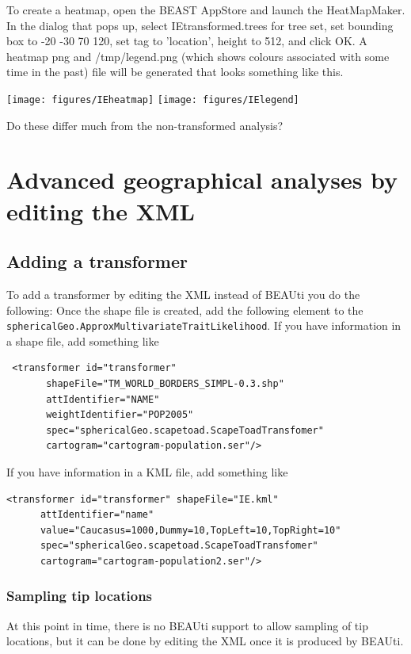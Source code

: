 \documentclass{article}
\begin{document}
To create a heatmap, open the BEAST AppStore and launch the HeatMapMaker. In the dialog that pops up, select IEtransformed.trees for tree set, set bounding box to -20 -30 70 120, set tag to 'location', height to 512,  and click OK. A heatmap png and /tmp/legend.png (which shows colours associated with some time in the past) file will be generated that looks something like this.

\texttt{[image: figures/IEheatmap]}
\texttt{[image: figures/IElegend]}

Do these differ much from the non-transformed analysis?

\section*{Advanced geographical analyses by editing the XML}
\subsection*{Adding a transformer}
To add a transformer by editing the XML instead of BEAUti you do the following: Once the shape file is created, add the following element to the {\tt sphericalGeo.ApproxMultivariateTraitLikelihood}. If you have information in a shape file, add something like

\begin{verbatim}
 <transformer id="transformer" 
       shapeFile="TM_WORLD_BORDERS_SIMPL-0.3.shp" 
       attIdentifier="NAME" 
       weightIdentifier="POP2005" 
       spec="sphericalGeo.scapetoad.ScapeToadTransfomer"
       cartogram="cartogram-population.ser"/> 
 \end{verbatim}

If you have information in a KML file, add something like

\begin{verbatim}
<transformer id="transformer" shapeFile="IE.kml"
      attIdentifier="name"
      value="Caucasus=1000,Dummy=10,TopLeft=10,TopRight=10"
      spec="sphericalGeo.scapetoad.ScapeToadTransfomer"
      cartogram="cartogram-population2.ser"/>
\end{verbatim}

\subsubsection*{Sampling tip locations}
At this point in time, there is no BEAUti support to allow sampling of tip locations, but it can be done by editing the XML once it is produced by BEAUti.
\end{document}
